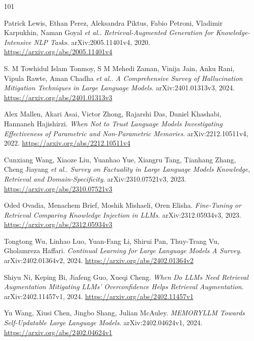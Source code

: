 \documentclass[11pt,a4paper]{article}
\begin{document}
\begin{thebibliography}{101}
\setlength{\itemsep}{2pt}

Patrick Lewis, Ethan Perez, Aleksandra Piktus, Fabio Petroni, Vladimir Karpukhin, Naman Goyal \emph{et al.}.
\newblock \emph{Retrieval-Augmented Generation for Knowledge-Intensive NLP Tasks}.
\newblock arXiv:2005.11401v4, 2020.
\newblock \url{https://arxiv.org/abs/2005.11401v4}

S. M Towhidul Islam Tonmoy, S M Mehedi Zaman, Vinija Jain, Anku Rani, Vipula Rawte, Aman Chadha \emph{et al.}.
\newblock \emph{A Comprehensive Survey of Hallucination Mitigation Techniques in Large Language Models}.
\newblock arXiv:2401.01313v3, 2024.
\newblock \url{https://arxiv.org/abs/2401.01313v3}

Alex Mallen, Akari Asai, Victor Zhong, Rajarshi Das, Daniel Khashabi, Hannaneh Hajishirzi.
\newblock \emph{When Not to Trust Language Models Investigating Effectiveness of Parametric and Non-Parametric Memories}.
\newblock arXiv:2212.10511v4, 2022.
\newblock \url{https://arxiv.org/abs/2212.10511v4}

Cunxiang Wang, Xiaoze Liu, Yuanhao Yue, Xiangru Tang, Tianhang Zhang, Cheng Jiayang \emph{et al.}.
\newblock \emph{Survey on Factuality in Large Language Models Knowledge, Retrieval and Domain-Specificity}.
\newblock arXiv:2310.07521v3, 2023.
\newblock \url{https://arxiv.org/abs/2310.07521v3}

Oded Ovadia, Menachem Brief, Moshik Mishaeli, Oren Elisha.
\newblock \emph{Fine-Tuning or Retrieval Comparing Knowledge Injection in LLMs}.
\newblock arXiv:2312.05934v3, 2023.
\newblock \url{https://arxiv.org/abs/2312.05934v3}

Tongtong Wu, Linhao Luo, Yuan-Fang Li, Shirui Pan, Thuy-Trang Vu, Gholamreza Haffari.
\newblock \emph{Continual Learning for Large Language Models A Survey}.
\newblock arXiv:2402.01364v2, 2024.
\newblock \url{https://arxiv.org/abs/2402.01364v2}

Shiyu Ni, Keping Bi, Jiafeng Guo, Xueqi Cheng.
\newblock \emph{When Do LLMs Need Retrieval Augmentation Mitigating LLMs' Overconfidence Helps Retrieval Augmentation}.
\newblock arXiv:2402.11457v1, 2024.
\newblock \url{https://arxiv.org/abs/2402.11457v1}

Yu Wang, Xiusi Chen, Jingbo Shang, Julian McAuley.
\newblock \emph{MEMORYLLM Towards Self-Updatable Large Language Models}.
\newblock arXiv:2402.04624v1, 2024.
\newblock \url{https://arxiv.org/abs/2402.04624v1}


\end{thebibliography}
\end{document}
